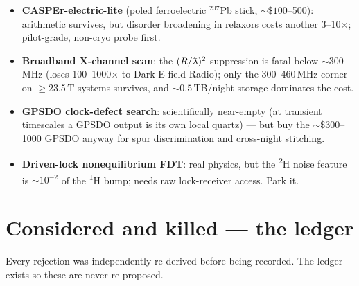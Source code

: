 \documentclass[11pt]{article}
\newcommand{\hnmr}{\textsuperscript{1}H}
\newcommand{\dnmr}{\textsuperscript{2}H}
\newcommand{\lambdabar}{{\mkern0.75mu\mathchar'26\mkern-9.75mu\lambda}}
\begin{document}
\begin{itemize}[leftmargin=1.2em]
\item \textbf{CASPEr-electric-lite} (poled ferroelectric $^{207}$Pb stick,
${\sim}\$100$--500): arithmetic survives, but disorder broadening in relaxors
costs another 3--10$\times$; pilot-grade, non-cryo probe first.
\item \textbf{Broadband X-channel scan}: the $(R/\lambdabar)^2$ suppression is
fatal below ${\sim}300$\,MHz (loses 100--1000$\times$ to Dark E-field Radio);
only the 300--460\,MHz corner on $\geq$23.5\,T systems survives, and
${\sim}0.5$\,TB/night storage dominates the cost.
\item \textbf{GPSDO clock-defect search}: scientifically near-empty (at
transient timescales a GPSDO output is its own local quartz) --- but buy the
${\sim}\$300$--1000 GPSDO anyway for spur discrimination and cross-night
stitching.
\item \textbf{Driven-lock nonequilibrium FDT}: real physics, but the \dnmr{}
noise feature is ${\sim}10^{-2}$ of the \hnmr{} bump; needs raw lock-receiver
access. Park it.
\end{itemize}

\section{Considered and killed --- the ledger}

\noindent Every rejection was independently re-derived before being recorded.
The ledger exists so these are never re-proposed.
\end{document}
